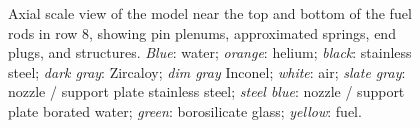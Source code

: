 \begin{figure}[h]
\begin{tikzpicture}[x=1cm,y=1cm]
    \end{tikzpicture}
    
    \caption[Axial scale view of aggregate pincell model near core top and
    bottom]{Axial scale view of the model near the top and bottom of the fuel
    rods in row 8, showing pin plenums, approximated
    springs, end plugs, and structures. \emph{Blue}: water; \emph{orange}: helium;
    \emph{black}: stainless steel; \emph{dark gray}: Zircaloy; \emph{dim gray}
    Inconel; \emph{white}: air; \emph{slate gray}: nozzle / support plate
    stainless steel; \emph{steel blue}: nozzle / support plate borated water;
    \emph{green}: borosilicate glass; \emph{yellow}: fuel. \label{fig:tb_detail}}
\end{figure}
